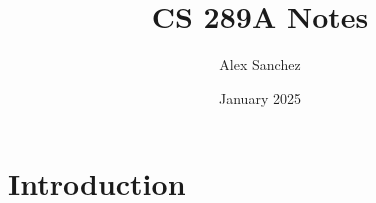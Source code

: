 \documentclass{article}
\title{CS 289A Notes}
\author{Alex Sanchez}
\date{January 2025}
\begin{document}
\maketitle

\section{Introduction}
\end{document}
